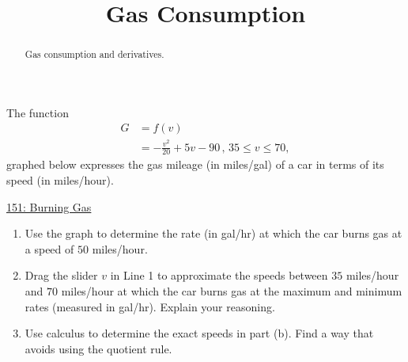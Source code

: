 \documentclass{ximera}
\title{Gas Consumption}
\begin{document}
\begin{abstract}
Gas consumption and derivatives.
\end{abstract}
\maketitle


\begin{question} \label{Q5hhhhgeyghhg}
The function
\begin{align*}
    G  &= f(v)    \\
         &=  -\frac{v^2}{20} + 5v -90 \, , \, 35\leq v \leq 70 ,
\end{align*}
graphed below expresses the gas mileage (in miles/gal) of a car in terms of its speed (in miles/hour).

\begin{onlineOnly}
    \begin{center}
\end{center}
\end{onlineOnly}

\href{https://www.desmos.com/calculator/fapdhcqptl}{151: Burning Gas}

\begin{enumerate}
\item Use the graph to determine the rate (in gal/hr) at which the car burns gas at a speed of $50$ miles/hour.

\item Drag the slider $v$ in Line 1 to approximate the speeds between $35$ miles/hour and $70$ miles/hour at which the car burns gas at the maximum and minimum rates (measured in gal/hr). Explain your reasoning.

\item Use calculus to determine the exact speeds in part (b). Find a way that avoids using the quotient rule.

\end{enumerate}


\end{question}
\end{document}
